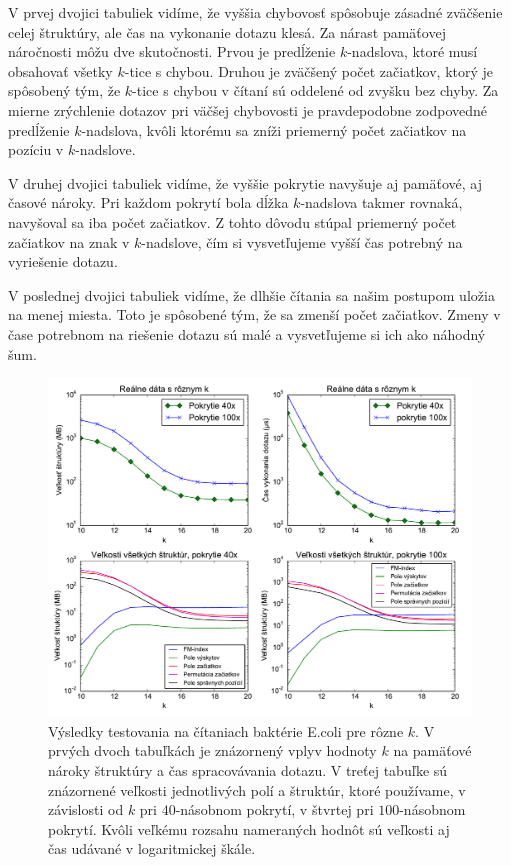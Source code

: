 V prvej dvojici
tabuliek vidíme, že vyššia chybovosť spôsobuje zásadné zväčšenie celej štruktúry, ale
čas na vykonanie dotazu klesá. Za nárast pamäťovej náročnosti môžu dve skutočnosti. Prvou
je predĺženie $k$-nadslova, ktoré musí obsahovať všetky $k$-tice s chybou. Druhou je zväčšený
počet začiatkov, ktorý je spôsobený tým, že $k$-tice s chybou v čítaní sú oddelené od zvyšku
bez chyby. Za mierne zrýchlenie dotazov pri väčšej chybovosti je pravdepodobne zodpovedné
predĺženie $k$-nadslova, kvôli ktorému sa zníži priemerný počet začiatkov na pozíciu
v $k$-nadslove.

V druhej dvojici tabuliek vidíme, že vyššie pokrytie navyšuje aj pamäťové, aj časové nároky.
Pri každom pokrytí bola dĺžka $k$-nadslova takmer rovnaká, navyšoval sa iba počet začiatkov.
Z tohto dôvodu stúpal priemerný počet začiatkov na znak v $k$-nadslove, čím si vysvetľujeme
vyšší čas potrebný na vyriešenie dotazu.

V poslednej dvojici tabuliek vidíme, že dlhšie čítania sa našim postupom uložia na menej
miesta. Toto je spôsobené tým, že sa zmenší počet začiatkov. Zmeny v čase potrebnom na
riešenie dotazu sú malé a vysvetľujeme si ich ako náhodný šum.

\begin{figure}

\centerline{\includegraphics[width=1\textwidth]{images/chart_difks.pdf}}

\caption[E.coli dáta s rôznym $k$]{Výsledky testovania na čítaniach baktérie E.coli pre rôzne $k$.
V prvých dvoch tabuľkách je znázornený vplyv hodnoty $k$ na
pamäťové nároky štruktúry a čas spracovávania dotazu. V treťej tabuľke sú znázornené veľkosti
jednotlivých polí a štruktúr, ktoré používame, v závislosti od $k$ pri $40$-násobnom pokrytí,
v štvrtej pri $100$-násobnom pokrytí. Kvôli veľkému rozsahu nameraných hodnôt sú veľkosti
aj čas udávané v logaritmickej škále.}

\label{chart:difks}

\end{figure}

